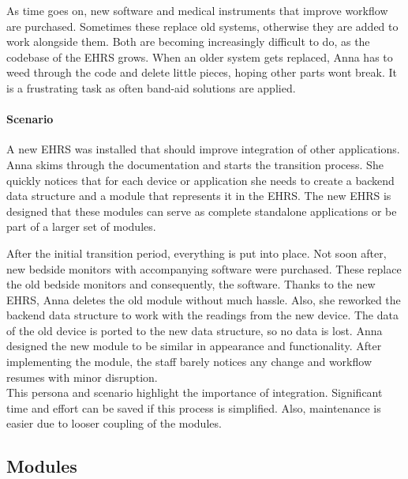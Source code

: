         As time goes on, new software and medical instruments that improve workflow are purchased. Sometimes these replace old systems, otherwise they are added to work alongside them. Both are becoming increasingly difficult to do, as the codebase of the EHRS grows. When an older system gets replaced, Anna has to weed through the code and delete little pieces, hoping other parts wont break. It is a frustrating task as often band-aid solutions are applied.

        \paragraph{Scenario} A new EHRS was installed that should improve integration of other applications. Anna skims through the documentation and starts the transition process. She quickly notices that for each device or application she needs to create a backend data structure and a module that represents it in the EHRS. The new EHRS is designed that these modules can serve as complete standalone applications or be part of a larger set of modules.

        After the initial transition period, everything is put into place. Not soon after, new bedside monitors with accompanying software were purchased. These replace the old bedside monitors and consequently, the software. Thanks to the new EHRS, Anna deletes the old module without much hassle. Also, she reworked the backend data structure to work with the readings from the new device. The data of the old device is ported to the new data structure, so no data is lost. Anna designed the new module to be similar in appearance and functionality. After implementing the module, the staff barely notices any change and workflow resumes with minor disruption.\\

        \noindent This persona and scenario highlight the importance of integration. Significant time and effort can be saved if this process is simplified. Also, maintenance is easier due to looser coupling of the modules.

    \subsection{Modules} \label{design_modules}
    
